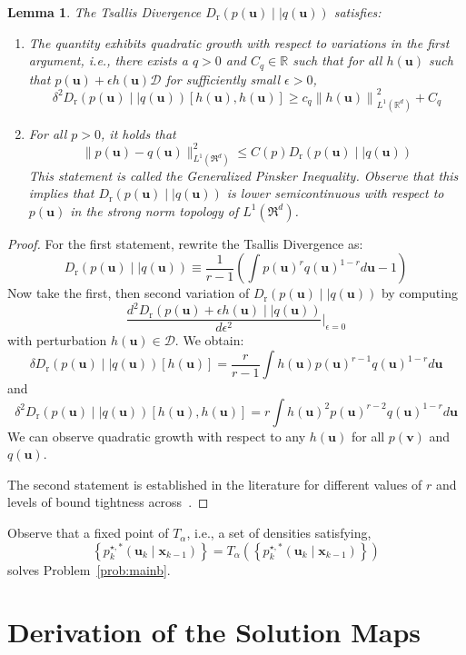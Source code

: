 \documentclass[a4paper,fleqn]{cas-sc}
\newcommand{\R}{\mathbb{R}}
\newcommand{\bv}[1]{\mathbf{#1}}
\newcommand{\sD}{\mathcal{D}}
\newcommand{\Dr}[2]{{D}_{\text{r}}\left(#1\mid \mid #2 \right)}
\newcommand{\optimalpolicygen}[3]{p^{\star,{#3}}_{{#1}} \left(\bv{u}_{{#1}}\mid \bv{x}_{{#2}} \right)}
\newtheorem{lemma}[theorem]{Lemma}
\begin{document}
\begin{lemma}\label{lem:tsdprop}
    The Tsallis Divergence $\Dr{p(\bv{u})}{q(\bv{u})}$ satisfies:
    \begin{enumerate}
        \item The quantity exhibits quadratic growth with respect to variations in the first argument, i.e., there exists a $q>0$ and $C_q\in\mathbb{R}$ such that for all $h(\bv{u})$ such that $p(\bv{u})+\epsilon h(\bv{u})\sD $ for sufficiently small $\epsilon>0$,
        \[
        \delta^2 \Dr{p(\bv{u})}{q(\bv{u})}[h(\bv{u}),h(\bv{u})]\ge c_q\left\|h(\bv{u})\right\|^2_{L^1(\R^d)} +C_q
        \]
        \item For all $p>0$, it holds that
\[
\|p(\bv{u})-q(\bv{u})\|^2_{L^1(\Re^d)}\le C(p) \Dr{p(\bv{u})}{q(\bv{u})} 
\]
This statement is called the \emph{Generalized Pinsker Inequality}. Observe that this implies that $\Dr{p(\bv{u})}{q(\bv{u})}$ is lower semicontinuous with respect to $p(\bv{u})$ in the strong norm topology of $L^1(\Re^d)$. 
    \end{enumerate}
\end{lemma}
\begin{proof}
    For the first statement, rewrite the Tsallis Divergence as:
\[
\Dr{p(\bv{u})}{q(\bv{u})}\equiv \frac{1}{r-1}\left(\int p(\bv{u})^r q(\bv{u})^{1-r} d\bv{u}-1\right)
\]
Now take the first, then second variation of $\Dr{p(\bv{u})}{q(\bv{u})}$ by computing
\[
\frac{d^2\Dr{p(\bv{u})+\epsilon h(\bv{u}) }{q(\bv{u})}}{d\epsilon^2}\Bigg\vert_{\epsilon=0}
\]
with perturbation $h(\bv{u})\in\sD$. We obtain:
\[
\delta \Dr{p(\bv{u})}{q(\bv{u})}[h(\bv{u})] = \frac{r}{r-1}\int h(\bv{u}) p(\bv{u})^{r-1} q(\bv{u})^{1-r} d\bv{u}
\]
and
\[
\delta^2 \Dr{p(\bv{u})}{q(\bv{u})}[h(\bv{u}),h(\bv{u})] = r \int h(\bv{u})^2 p(\bv{u})^{r-2} q(\bv{u})^{1-r} d\bv{u}
\]
We can observe quadratic growth with respect to any $h(\bv{u})$ for all $p(\bv{v})$ and $q(\bv{u})$. 

The second statement is established in the literature for different values of $r$ and levels of bound tightness across~\cite{gilardoni2010pinsker,reid2009generalised,beretta2026generalized}.
\end{proof}

Observe that a fixed point of $T_{\alpha}$, i.e., a set of densities satisfying,
    \[
    \left\{\optimalpolicygen{k}{k-1}{*}\right\} = T_{\alpha}\left(\left\{\optimalpolicygen{k}{k-1}{*}\right\}\right)
    \]
    solves Problem~\ref{prob:mainb}.


\section{Derivation of the Solution Maps}\label{sec:proofs}
\end{document}
